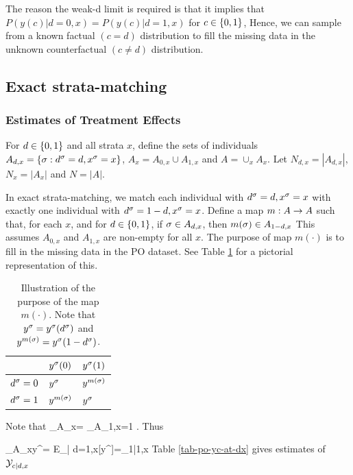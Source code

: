 The reason the weak-d limit
is required is that
it implies that $P(y(c)|d=0,x)=
P(y(c)|d=1,x)$ for $c\in \{0,1\}$,
Hence, we can sample from a
known factual $(c=d)$
distribution to
fill  the missing data
in the unknown counterfactual $(c\neq d)$
distribution.





\subsection{Exact   strata-matching}

\subsubsection{Estimates of Treatment Effects}
\label{sec-estimates}
For $ d\in \{0,1\}$ and all strata $x$,
define the sets of individuals
$A_{ d,x}=\{\sigma:  d^\sigma= d, x^\sigma=x\}$,
$A_x=A_{0,x}\cup A_{1,x}$ and $A=\cup_x A_x$.
Let $N_{ d,x}=|A_{ d,x}|$,
$N_x= |A_x|$ and $N=|A|$.

In exact   strata-matching,
we match each individual with
$ d^\sigma=d, x^\sigma=x$
with
exactly
one individual
with $ d^\sigma=1-d, x^\sigma=x$.
Define a map $m:A\rightarrow A$
such that,
for each $x$, and
for $d\in \{0,1\}$,
if $\sigma\in A_{d,x}$, then
$m(\sigma)\in A_{1-d,x}$
This assumes $A_{0,x}$ and $A_{1,x}$
are non-empty for all $x$.
The purpose of map $m(\cdot)$
is
to fill in the missing data in the
PO dataset. See Table \ref{tab-po-s-map}
for a pictorial representation of
this.

\begin{table}[h!]
\centering
\begin{tabular}{|l|l|l|}
\hline
 & \cellcolor[HTML]{ECF4FF}$y^\sigma(0)$ & \cellcolor[HTML]{ECF4FF}$y^\sigma(1)$ \\ \hline
\cellcolor[HTML]{ECF4FF}$ d^\sigma=0$ & $y^\sigma$ & $y^{m(\sigma)}$ \\ \hline
\cellcolor[HTML]{ECF4FF}$ d^\sigma=1$ & $y^{m(\sigma)}$ & $y^\sigma$ \\ \hline
\end{tabular}
\caption{Illustration of the
purpose of the map $m(\cdot)$.
Note that $y^\sigma=y^\sigma( d^\sigma)$
 and $y^{m(\sigma)}=y^\sigma(1-d^\sigma)$.}
\label{tab-po-s-map}
\end{table}



Note that
\beq
\sum_{\s\in A_{x}}=
\sum_{\s\in A_{1,x}}=1
\;.
\eeq
Thus

\beq
\sum_{\s\in A_{x}}y^\s=
E_{\s| d=1,x}[y^\s]=\caly_{1|1,x}
\eeq
Table \ref{tab-po-yc-at-dx}
gives
estimates of
$ {\cal Y}_{c| d ,x}$

